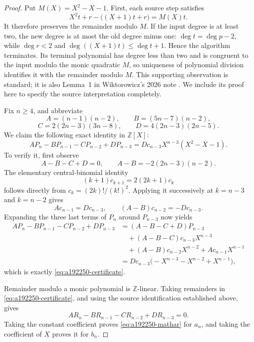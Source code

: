 \begin{proof}
Put $M(X)=X^2-X-1$. First, each source step satisfies
\[
 X^2t+r-\bigl((X+1)t+r\bigr)=M(X)t.
\]
It therefore preserves the remainder modulo $M$. If the input degree is
at least two, the new degree is at most the old degree minus one:
$\deg t=\deg p-2$, while $\deg r<2$ and
$\deg((X+1)t)\leq\deg t+1$. Hence the algorithm terminates.
Its terminal polynomial has degree less than two and is congruent to
the input modulo the monic quadratic $M$, so uniqueness of polynomial
division identifies it with the remainder modulo $M$. This supporting
observation is standard; it is also Lemma~1 in Wiktorowicz's 2026 note
\cite{Wiktorowicz2026Reduction}. We include its proof here to specify the
source interpretation completely.

Fix $n\geq4$, and abbreviate
\[
 A=(n-1)(n-2),\qquad B=(5n-7)(n-2),
\]
\[
 C=2(2n-3)(3n-8),\qquad D=4(2n-3)(2n-5).
\]
We claim the following exact identity in $\mathbb Z[X]$:
\begin{equation}
\label{eq:a192250-certificate}
 A P_n-B P_{n-1}-C P_{n-2}+D P_{n-3}
   =D c_{n-3}X^{n-3}(X^2-X-1).
\end{equation}
To verify it, first observe
\[
 A-B-C+D=0,\qquad A-B=-2(2n-3)(n-2).
\]
The elementary central-binomial identity
\[
 (k+1)c_{k+1}=2(2k+1)c_k
\]
follows directly from $c_k=(2k)!/(k!)^2$. Applying it successively at
$k=n-3$ and $k=n-2$ gives
\[
 A c_{n-1}=D c_{n-3},\qquad
 (A-B)c_{n-2}=-D c_{n-3}.
\]
Expanding the three last terms of $P_n$ around $P_{n-3}$ now yields
\begin{align*}
 A P_n-B P_{n-1}-C P_{n-2}+D P_{n-3}
 &= (A-B-C+D)P_{n-3}\\
 &\quad +(A-B-C)c_{n-3}X^{n-3}\\
 &\quad +(A-B)c_{n-2}X^{n-2}
       +A c_{n-1}X^{n-1}\\
 &=D c_{n-3}\bigl(-X^{n-3}-X^{n-2}+X^{n-1}\bigr),
\end{align*}
which is exactly \eqref{eq:a192250-certificate}.

Remainder modulo a monic polynomial is $\mathbb Z$-linear.
Taking remainders in \eqref{eq:a192250-certificate}, and using the source
identification established above, gives
\[
 A R_n-B R_{n-1}-C R_{n-2}+D R_{n-3}=0.
\]
Taking the constant coefficient proves \eqref{eq:a192250-mathar} for
$a_n$, and taking the coefficient of $X$ proves it for $b_n$.
\end{proof}

